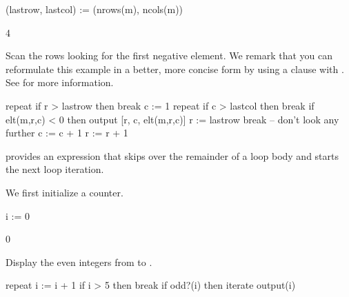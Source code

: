 {\begin{xtc}
\begin{spadsrc}
(lastrow, lastcol) := (nrows(m), ncols(m)) 
\end{spadsrc}
\begin{TeXOutput}
\begin{fricasmath}{12}
4%
\end{fricasmath}
\end{TeXOutput}
\end{xtc}
%
\begin{xtc}
\begin{xtccomment}
Scan the rows looking for the first negative element.
We remark that you can reformulate this example in a better, more
concise form by using a  clause with .
See
for more information.
\end{xtccomment}
\begin{spadsrc}
repeat
  if r > lastrow then break
  c := 1
  repeat
    if c > lastcol then break
    if elt(m,r,c) < 0 then
      output [r, c, elt(m,r,c)]
      r := lastrow
      break     -- don't look any further
    c := c + 1
  r := r + 1
\end{spadsrc}
\end{xtc}


\Language{} provides an  expression that
skips over the remainder of a loop body and starts the next loop iteration.
\begin{xtc}
\begin{xtccomment}
We first initialize a counter.
\end{xtccomment}
\begin{spadsrc}
i := 0 
\end{spadsrc}
\begin{TeXOutput}
\begin{fricasmath}{1}
0%
\end{fricasmath}
\end{TeXOutput}
\end{xtc}
\begin{xtc}
\begin{xtccomment}
Display the even integers from  to .
\end{xtccomment}
\begin{spadsrc}
repeat
  i := i + 1
  if i > 5 then break
  if odd?(i) then iterate
  output(i)
\end{spadsrc}
\end{xtc}

}
